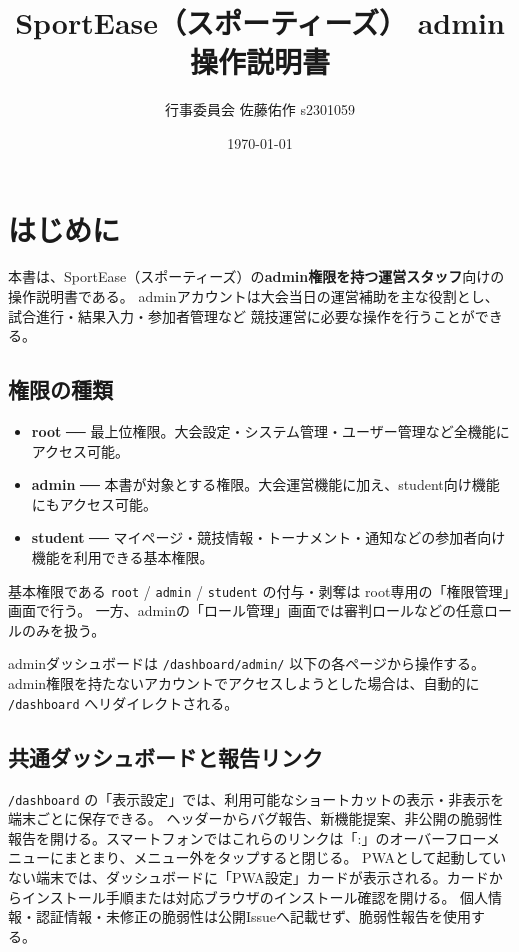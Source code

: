 \documentclass[12pt]{ltjsarticle}
\newcommand{\code}[1]{\colorbox{gray!20}{\texttt{#1}}}
\begin{document}
\title{SportEase（スポーティーズ） admin操作説明書}
\author{行事委員会 佐藤佑作 s2301059}
\date{\today}
\maketitle
\tableofcontents

\newpage

\section{はじめに}

本書は、SportEase（スポーティーズ）の\textbf{admin権限を持つ運営スタッフ}向けの操作説明書である。
adminアカウントは大会当日の運営補助を主な役割とし、試合進行・結果入力・参加者管理など
競技運営に必要な操作を行うことができる。

\subsection*{権限の種類}
\begin{itemize}
  \item \textbf{root} ── 最上位権限。大会設定・システム管理・ユーザー管理など全機能にアクセス可能。
  \item \textbf{admin} ── 本書が対象とする権限。大会運営機能に加え、student向け機能にもアクセス可能。
  \item \textbf{student} ── マイページ・競技情報・トーナメント・通知などの参加者向け機能を利用できる基本権限。
\end{itemize}

基本権限である \code{root} / \code{admin} / \code{student} の付与・剥奪は
root専用の「権限管理」画面で行う。
一方、adminの「ロール管理」画面では審判ロールなどの任意ロールのみを扱う。

adminダッシュボードは \code{/dashboard/admin/} 以下の各ページから操作する。
admin権限を持たないアカウントでアクセスしようとした場合は、自動的に \code{/dashboard} へリダイレクトされる。

\subsection*{共通ダッシュボードと報告リンク}

\code{/dashboard} の「表示設定」では、利用可能なショートカットの表示・非表示を端末ごとに保存できる。
ヘッダーからバグ報告、新機能提案、非公開の脆弱性報告を開ける。スマートフォンではこれらのリンクは「:」のオーバーフローメニューにまとまり、メニュー外をタップすると閉じる。
PWAとして起動していない端末では、ダッシュボードに「PWA設定」カードが表示される。カードからインストール手順または対応ブラウザのインストール確認を開ける。
個人情報・認証情報・未修正の脆弱性は公開Issueへ記載せず、脆弱性報告を使用する。
\end{document}
